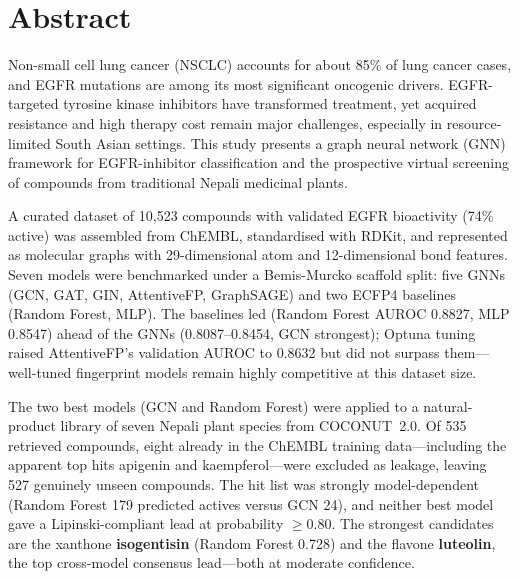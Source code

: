 
\chapter*{Abstract}
\thispagestyle{plain}

{\singlespacing
\noindent
Non-small cell lung cancer (NSCLC) accounts for about 85\% of lung cancer cases, and
EGFR mutations are among its most significant oncogenic drivers. EGFR-targeted tyrosine
kinase inhibitors have transformed treatment, yet acquired resistance and high therapy
cost remain major challenges, especially in resource-limited South Asian settings. This
study presents a graph neural network (GNN) framework for EGFR-inhibitor classification
and the prospective virtual screening of compounds from traditional Nepali medicinal
plants.

\vspace{0.18cm}
\noindent
A curated dataset of 10,523 compounds with validated EGFR bioactivity (74\% active) was
assembled from ChEMBL, standardised with RDKit, and represented as molecular graphs with
29-dimensional atom and 12-dimensional bond features. Seven models were benchmarked under
a Bemis-Murcko scaffold split: five GNNs (GCN, GAT, GIN, AttentiveFP, GraphSAGE) and two
ECFP4 baselines (Random Forest, MLP). The baselines led (Random Forest AUROC 0.8827, MLP
0.8547) ahead of the GNNs (0.8087--0.8454, GCN strongest); Optuna tuning raised
AttentiveFP's validation AUROC to 0.8632 but did not surpass them---well-tuned fingerprint
models remain highly competitive at this dataset size.

\vspace{0.18cm}
\noindent
The two best models (GCN and Random Forest) were applied to a natural-product library of
seven Nepali plant species from COCONUT~2.0. Of 535 retrieved compounds, eight already in
the ChEMBL training data---including the apparent top hits apigenin and kaempferol---were
excluded as leakage, leaving 527 genuinely unseen compounds. The hit list was strongly
model-dependent (Random Forest 179 predicted actives versus GCN 24), and neither best
model gave a Lipinski-compliant lead at probability $\geq 0.80$. The strongest candidates
are the xanthone \textbf{isogentisin} (Random Forest 0.728) and the flavone
\textbf{luteolin}, the top cross-model consensus lead---both at moderate confidence.

}
